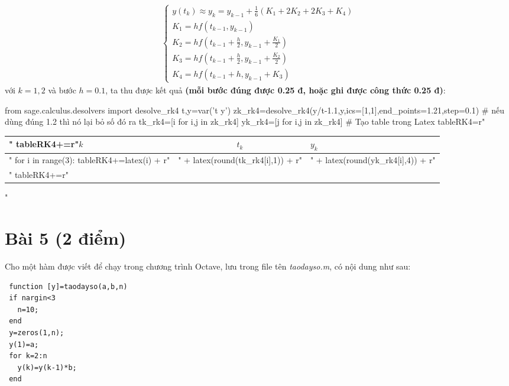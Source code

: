 \documentclass[12pt]{article}
\begin{document}
\begin{enumerate}[a).]
\begin{align*}
\left\lbrace \begin{array}{l}
               y(t_k) \approx y_k = y_{k-1} + \frac{1}{6}(K_1 + 2K_2 + 2K_3 + K_4) \\
               K_1 = h f(t_{k-1},y_{k-1}) \\
               K_2 = h f\left(t_{k-1}+\frac{h}{2},y_{k-1} + \frac{K_1}{2}\right) \\
               K_3 = h f\left(t_{k-1}+\frac{h}{2},y_{k-1} + \frac{K_2}{2}\right) \\
               K_4 = h f\left(t_{k-1}+h,y_{k-1} + K_3\right)
               \end{array}
\right.
\end{align*}
với $k=1, 2$ và bước $h=0.1$, ta thu được kết quả \textbf{(mỗi bước đúng được 0.25 đ, hoặc ghi được công thức 0.25 đ)}:
\begin{sagesilent}
 from sage.calculus.desolvers import desolve_rk4
 t,y=var('t y')
 zk_rk4=desolve_rk4(y/t-1.1,y,ics=[1,1],end_points=1.21,step=0.1) # nếu dùng đúng 1.2 thì nó lại bỏ số đó ra
 tk_rk4=[i for i,j in zk_rk4]
 yk_rk4=[j for i,j in zk_rk4]
 # Tạo table trong Latex
 tableRK4=r"\begin{tabular}{l|c|l}"
 tableRK4+=r"$k$ & $t_k$ & $y_k$ \\ \hline"
 for i in range(3):
   tableRK4+=latex(i) + r"&" + latex(round(tk_rk4[i],1)) + r"&" + latex(round(yk_rk4[i],4)) + r"\\"
 tableRK4+=r"\end{tabular}"
\end{sagesilent}

  \begin{center}  \end{center} 


\end{enumerate}

\section{Bài 5 (2 điểm)}

Cho một hàm được viết để chạy trong chương trình Octave, lưu trong file tên \textit{taodayso.m}, có nội dung như sau:
\begin{verbatim}
 function [y]=taodayso(a,b,n)
 if nargin<3
   n=10;
 end
 y=zeros(1,n);
 y(1)=a;
 for k=2:n
   y(k)=y(k-1)*b;
 end
\end{verbatim}
\end{document}

